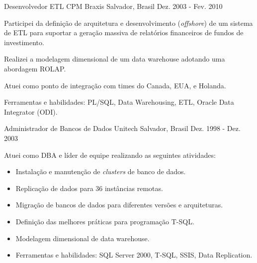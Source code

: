 \begin{cventries}
\cventry
{Desenvolvedor ETL} %
{CPM Braxis} %
{Salvador, Brasil} %
{Dez. 2003 - Fev. 2010} %
{ %
\begin{cvitems}
\item{Participei da definição de arquitetura e desenvolvimento (\textit{offshore}) de um sistema de ETL para suportar a geração massiva de relatórios financeiros de fundos de investimento.} 
\item{Realizei a modelagem dimensional de um data warehouse adotando uma abordagem ROLAP.}
\item{Atuei como ponto de integração com times do Canada, EUA, e Holanda.}
\item{Ferramentas e habilidades: PL/SQL, Data Warehousing, ETL, Oracle Data Integrator (ODI).}
\end{cvitems}
}


\cventry
{Administrador de Bancos de Dados} %
{Unitech} %
{Salvador, Brasil} %
{Dez. 1998 - Dez. 2003} %
{ %
\begin{cvitems}
	\item{Atuei como DBA e líder de equipe realizando as seguintes atividades:}
	\begin{itemize}	
		\item{Instalação e manutenção de \textit{clusters} de banco de dados.}
		\item{Replicação de dados para 36 instâncias remotas.} 
		\item{Migração de bancos de dados para diferentes versões e arquiteturas.}
		\item{Definição das melhores práticas para programação T-SQL.}
		\item{Modelagem dimensional de data warehouse.}
		\item{Ferramentas e habilidades: SQL Server 2000, T-SQL, SSIS, Data Replication.}
	\end{itemize}
\end{cvitems}
}


\end{cventries}